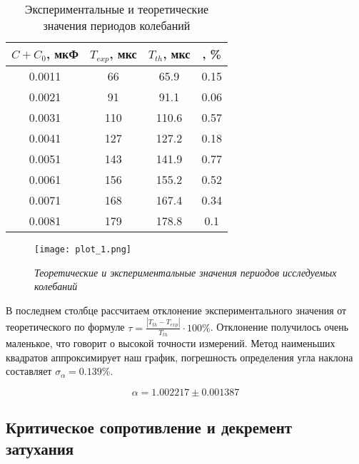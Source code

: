 \documentclass[a4paper,12pt]{article} %
\begin{document}
    \begin{table}[h]
		\centering
		\begin{tabular}{|c|c|c|c|}
		\hline
		$C + C_0$, мкФ & $T_{exp}$, мкс & $T_{th}$, мкс & \tau, \% \\ \hline
            0.0011 & 66 & 65.9 & 0.15 \\
		  0.0021 & 91 & 91.1 & 0.06 \\
		  0.0031 & 110 & 110.6 & 0.57 \\
		0.0041 & 127 & 127.2 & 0.18 \\
		0.0051 & 143 & 141.9 & 0.77 \\
		0.0061 & 156 & 155.2 & 0.52 \\
            0.0071 & 168 & 167.4 & 0.34 \\
            0.0081 & 179 & 178.8 & 0.1 \\
		\hline
		\end{tabular}
		\caption{Экспериментальные и теоретические значения периодов колебаний}
            \label{table1}
    \end{table}

    \begin{figure}[h]
    \begin{center}
		\texttt{[image: plot\_1.png]}
    \end{center}
	\caption{\textit{Теоретические и экспериментальные значения периодов исследуемых колебаний}}
	\label{plot1}
    \end{figure}
    
    В последнем столбце рассчитаем отклонение экспериментального значения от теоретического по формуле $\tau = \frac{\left| T_{th} - T_{exp} \right|}{T_{th}} \cdot 100 \%$. Отклонение получилось очень маленькое, что говорит о высокой точности измерений. Метод наименьших квадратов аппроксимирует наш график, погрешность определения угла наклона составляет $\sigma_\alpha = 0.139 \%$.

    \[ \alpha = 1.002217 \pm 0.001387 \]

\newpage

\subsection{Критическое сопротивление и декремент затухания}
\end{document}
